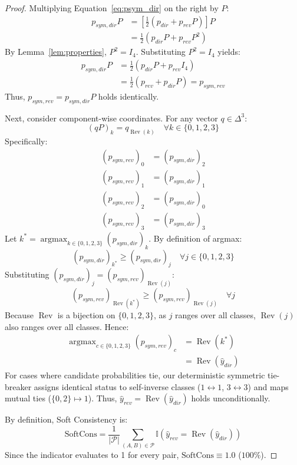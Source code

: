 \documentclass[11pt,a4paper,twocolumn]{article}
\begin{document}
\begin{proof}
Multiplying Equation~\eqref{eq:psym_dir} on the right by $P$:
\begin{align*}
p_{sym,dir} P &= \left[\frac{1}{2}\left(p_{dir} + p_{rev} P\right)\right] P \\
&= \frac{1}{2}\left(p_{dir} P + p_{rev} P^2\right)
\end{align*}
By Lemma~\ref{lem:properties}, $P^2 = I_4$. Substituting $P^2 = I_4$ yields:
\begin{align*}
p_{sym,dir} P &= \frac{1}{2}\left(p_{dir} P + p_{rev} I_4\right) \\
&= \frac{1}{2}\left(p_{rev} + p_{dir} P\right) = p_{sym,rev}
\end{align*}
Thus, $p_{sym,rev} = p_{sym,dir} P$ holds identically.

Next, consider component-wise coordinates. For any vector $q \in \Delta^3$:
\begin{equation*}
(q P)_k = q_{\operatorname{Rev}(k)} \quad \forall k \in \{0, 1, 2, 3\}
\end{equation*}
Specifically:
\begin{align*}
(p_{sym,rev})_0 &= (p_{sym,dir})_2 \\
(p_{sym,rev})_1 &= (p_{sym,dir})_1 \\
(p_{sym,rev})_2 &= (p_{sym,dir})_0 \\
(p_{sym,rev})_3 &= (p_{sym,dir})_3
\end{align*}
Let $k^* = \operatorname{argmax}_{k \in \{0,1,2,3\}} (p_{sym,dir})_k$. By definition of argmax:
\begin{equation*}
(p_{sym,dir})_{k^*} \ge (p_{sym,dir})_j \quad \forall j \in \{0,1,2,3\}
\end{equation*}
Substituting $(p_{sym,dir})_j = (p_{sym,rev})_{\operatorname{Rev}(j)}$:
\begin{equation*}
(p_{sym,rev})_{\operatorname{Rev}(k^*)} \ge (p_{sym,rev})_{\operatorname{Rev}(j)} \quad \forall j
\end{equation*}
Because $\operatorname{Rev}$ is a bijection on $\{0, 1, 2, 3\}$, as $j$ ranges over all classes, $\operatorname{Rev}(j)$ also ranges over all classes. Hence:
\begin{align*}
\operatorname{argmax}_{c \in \{0,1,2,3\}} (p_{sym,rev})_c &= \operatorname{Rev}(k^*) \\
&= \operatorname{Rev}(\hat{y}_{dir})
\end{align*}
For cases where candidate probabilities tie, our deterministic symmetric tie-breaker assigns identical status to self-inverse classes ($1 \leftrightarrow 1$, $3 \leftrightarrow 3$) and maps mutual ties ($\{0, 2\} \mapsto 1$). Thus, $\hat{y}_{rev} = \operatorname{Rev}(\hat{y}_{dir})$ holds unconditionally.

By definition, Soft Consistency is:
\begin{equation*}
\text{SoftCons} = \frac{1}{|\mathcal{P}|} \sum_{(A, B) \in \mathcal{P}} \mathbb{I}\left(\hat{y}_{rev} = \operatorname{Rev}(\hat{y}_{dir})\right)
\end{equation*}
Since the indicator evaluates to 1 for every pair, $\text{SoftCons} \equiv 1.0$ ($100\%$).
\end{proof}
\end{document}
